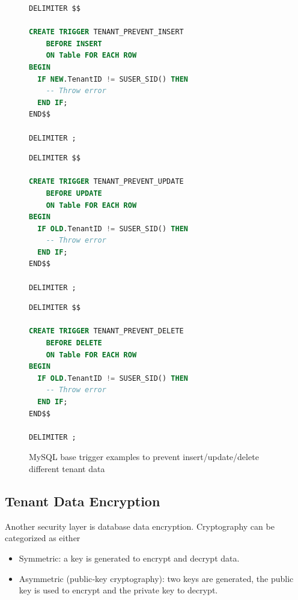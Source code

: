 \documentclass[11pt,english]{article} %
\begin{document}
\begin{figure}[h]
\centering
\begin{minipage}[t]{.31\textwidth}
\centering
\begin{lstlisting}[language=sql,numbers=none]
DELIMITER $$

CREATE TRIGGER TENANT_PREVENT_INSERT
    BEFORE INSERT
    ON Table FOR EACH ROW
BEGIN
  IF NEW.TenantID != SUSER_SID() THEN  
    -- Throw error
  END IF;
END$$    

DELIMITER ;
\end{lstlisting}
\end{minipage}%
\hspace{0.3cm}
\begin{minipage}[t]{.31\textwidth}
\centering
\begin{lstlisting}[language=sql,numbers=none]
DELIMITER $$

CREATE TRIGGER TENANT_PREVENT_UPDATE
    BEFORE UPDATE
    ON Table FOR EACH ROW
BEGIN
  IF OLD.TenantID != SUSER_SID() THEN  
    -- Throw error
  END IF;
END$$    

DELIMITER ;
\end{lstlisting}
\end{minipage}
\hspace{0.3cm}
\begin{minipage}[t]{.31\textwidth}
\centering
\begin{lstlisting}[language=sql,numbers=none]
DELIMITER $$

CREATE TRIGGER TENANT_PREVENT_DELETE
    BEFORE DELETE
    ON Table FOR EACH ROW
BEGIN
  IF OLD.TenantID != SUSER_SID() THEN  
    -- Throw error
  END IF;
END$$    

DELIMITER ;
\end{lstlisting}
\end{minipage}
\caption{MySQL base trigger examples to prevent insert/update/delete different tenant data}
\label{fig:tenant-triggers-data-isolation}
\end{figure}


\subsection{Tenant Data Encryption}
Another security layer is database data encryption.
Cryptography can be categorized as either 
\begin{itemize}
    \item Symmetric: a key is generated to encrypt and decrypt data.
    \item Asymmetric (public‐key cryptography): two keys are generated, the public key is used to encrypt and the private key to decrypt.
\end{itemize}
\end{document}
